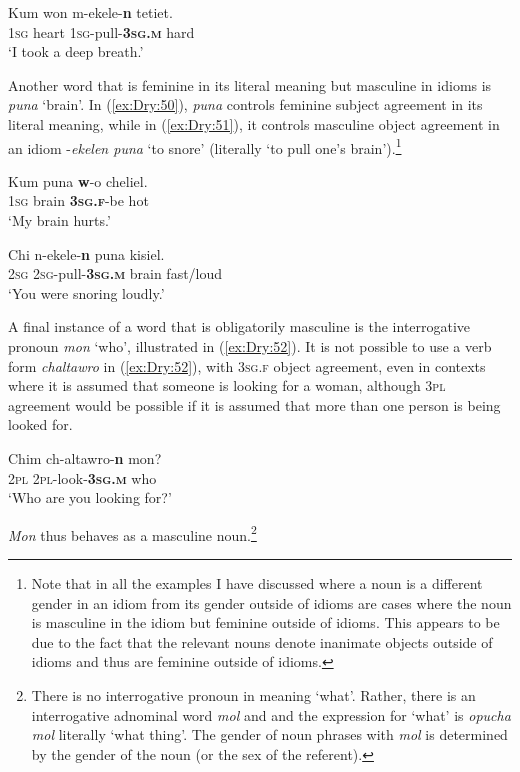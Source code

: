 \documentclass[output=collectionpaper]{langsci/langscibook}
\begin{document}
\ea \label{ex:Dry:49}
\gll Kum	won	m-ekele-\textbf{n}	tetiet.\\
\textsc{1sg} heart \textsc{1sg}-pull-\textbf{\textsc{3sg.m}} hard\\
\glt `I took a deep breath.'
\z

Another word that is feminine in its literal meaning but masculine in idioms is \textit{puna} `brain'. In (\ref{ex:Dry:50}), \textit{puna} controls feminine subject agreement in its literal meaning, while in (\ref{ex:Dry:51}), it controls masculine object agreement in an idiom -\textit{ekelen puna} `to snore' (literally `to pull one's brain').\footnote{Note that in all the examples I have discussed where a noun is a different gender in an idiom from its gender outside of idioms are cases where the noun is masculine in the idiom but feminine outside of idioms. This appears to be due to the fact that the relevant nouns denote inanimate objects outside of idioms and thus are feminine outside of idioms.}

\ea \label{ex:Dry:50}
\gll Kum	puna	\textbf{w}-o	cheliel.\\
\textsc{1sg} brain \textbf{\textsc{3sg.f}}-be hot\\
\glt `My brain hurts.'
\z

\ea \label{ex:Dry:51}
\gll Chi	n-ekele-\textbf{n}	puna	kisiel.\\
\textsc{2sg} \textsc{2sg}-pull-\textbf{\textsc{3sg.m}} brain fast/loud\\
\glt `You were snoring loudly.'
\z

A final instance of a word that is obligatorily masculine is the interrogative pronoun \textit{mon} `who', illustrated in (\ref{ex:Dry:52}). It is not possible to use a verb form \textit{chaltawro} in (\ref{ex:Dry:52}), with \textsc{3sg.f} object agreement, even in contexts where it is assumed that someone is looking for a woman, although \textsc{3pl} agreement would be possible if it is assumed that more than one person is being looked for.

\ea \label{ex:Dry:52}
\gll Chim	ch-altawro-\textbf{n}	mon?\\
\textsc{2pl} \textsc{2pl}-look-\textbf{\textsc{3sg.m}} who\\
\glt `Who are you looking for?'
\z

\textit{Mon} thus behaves as a masculine noun.\footnote{There is no interrogative pronoun in  meaning `what'. Rather, there is an interrogative adnominal word \textit{mol} and and the expression for `what' is \textit{opucha mol} literally `what thing'. The gender of noun phrases with \textit{mol} is determined by the gender of the noun (or the sex of the referent).}
\end{document}
